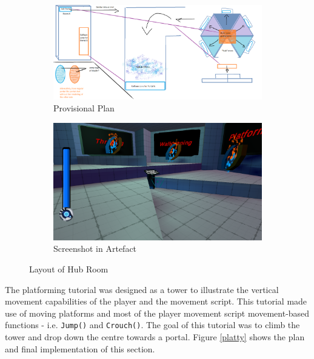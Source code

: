 \begin{figure}[H]
\centering
\begin{subfigure}{0.45\textwidth}
  \centering
  \includegraphics[width=1\linewidth]{Figures/hubplan.png}
  \caption{Provisional Plan}
\end{subfigure}%
\begin{subfigure}{0.45\textwidth}
  \centering
  \includegraphics[width=1\linewidth]{Figures/hub.png}
  \caption{Screenshot in Artefact}
\end{subfigure}
\caption{Layout of Hub Room}
\label{hub}
\end{figure}

\noindent The platforming tutorial was designed as a tower to illustrate the vertical movement capabilities of the player and the movement script. This tutorial made use of moving platforms and most of the player movement script movement-based functions - i.e. \texttt{Jump()} and \texttt{Crouch()}. The goal of this tutorial was to climb the tower and drop down the centre towards a portal. Figure \ref{platty} shows the plan and final implementation of this section. 

